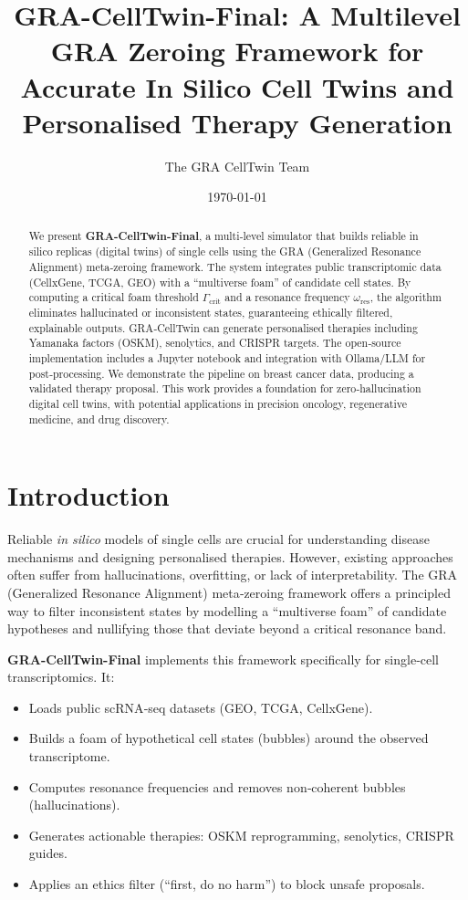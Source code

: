 \documentclass[12pt,a4paper]{article}
\title{GRA-CellTwin-Final: A Multilevel GRA Zeroing Framework for Accurate In Silico Cell Twins and Personalised Therapy Generation}
\author{The GRA CellTwin Team}
\date{\today}
\begin{document}
\maketitle

\begin{abstract}
We present \textbf{GRA-CellTwin-Final}, a multi‑level simulator that builds reliable in silico replicas (digital twins) of single cells using the GRA (Generalized Resonance Alignment) meta‑zeroing framework. The system integrates public transcriptomic data (CellxGene, TCGA, GEO) with a “multiverse foam” of candidate cell states. By computing a critical foam threshold $\Gamma_{\text{crit}}$ and a resonance frequency $\omega_{\text{res}}$, the algorithm eliminates hallucinated or inconsistent states, guaranteeing ethically filtered, explainable outputs. GRA‑CellTwin can generate personalised therapies including Yamanaka factors (OSKM), senolytics, and CRISPR targets. The open‑source implementation includes a Jupyter notebook and integration with Ollama/LLM for post‑processing. We demonstrate the pipeline on breast cancer data, producing a validated therapy proposal. This work provides a foundation for zero‑hallucination digital cell twins, with potential applications in precision oncology, regenerative medicine, and drug discovery.
\end{abstract}

\section{Introduction}
Reliable \textit{in silico} models of single cells are crucial for understanding disease mechanisms and designing personalised therapies. However, existing approaches often suffer from hallucinations, overfitting, or lack of interpretability. The GRA (Generalized Resonance Alignment) meta‑zeroing framework offers a principled way to filter inconsistent states by modelling a “multiverse foam” of candidate hypotheses and nullifying those that deviate beyond a critical resonance band.

\textbf{GRA-CellTwin-Final} implements this framework specifically for single‑cell transcriptomics. It:
\begin{itemize}
    \item Loads public scRNA‑seq datasets (GEO, TCGA, CellxGene).
    \item Builds a foam of hypothetical cell states (bubbles) around the observed transcriptome.
    \item Computes resonance frequencies and removes non‑coherent bubbles (hallucinations).
    \item Generates actionable therapies: OSKM reprogramming, senolytics, CRISPR guides.
    \item Applies an ethics filter (“first, do no harm”) to block unsafe proposals.
\end{itemize}
\end{document}
